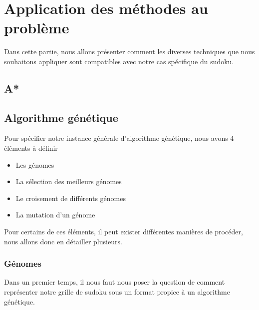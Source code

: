 \chapter{Application des méthodes au problème}
    Dans cette partie, nous allons présenter comment les diverses techniques que nous souhaitons appliquer sont compatibles avec notre cas spécifique du sudoku.
    \section{A*}
    \section{Algorithme génétique}
        Pour spécifier notre instance générale d'algorithme génétique, nous avons 4 éléments à définir
        \begin{itemize}
            \item Les génomes
            \item La sélection des meilleurs génomes
            \item Le croisement de différents génomes
            \item La mutation d'un génome
        \end{itemize}
        Pour certains de ces éléments, il peut exister différentes manières de procéder, nous allons donc en détailler plusieurs.
        \subsection{Génomes}
            Dans un premier temps, il nous faut nous poser la question de comment représenter notre grille de sudoku sous un format propice à un algorithme génétique.\\
